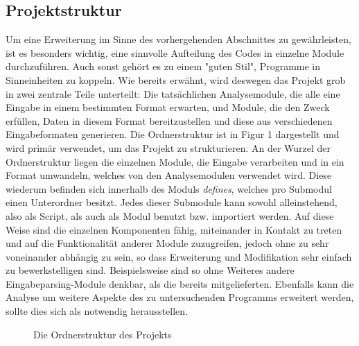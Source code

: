 \documentclass[11pt]{article}
\begin{document}
\subsection{Projektstruktur} Um eine Erweiterung im Sinne des vorhergehenden Abschnittes zu
gewährleisten, ist es besonders wichtig, eine sinnvolle Aufteilung des Codes in einzelne Module
durchzuführen. Auch sonst gehört es zu einem  "guten Stil", Programme in Sinneinheiten zu koppeln.
Wie bereits erwähnt, wird deswegen das Projekt grob in zwei zentrale Teile unterteilt: Die
tatsächlichen Analysemodule, die alle eine Eingabe in einem bestimmten Format erwarten, und Module,
die den Zweck erfüllen, Daten in diesem Format bereitzustellen und diese aus verschiedenen
Eingabeformaten generieren. Die Ordnerstruktur ist in Figur 1 dargestellt und wird
primär verwendet, um das Projekt zu strukturieren. An der Wurzel der Ordnerstruktur liegen die
einzelnen Module, die Eingabe verarbeiten und in ein Format umwandeln, welches von den Analysemodulen
verwendet wird. Diese wiederum befinden sich innerhalb des Moduls \textit{defines}, welches pro
Submodul einen Unterordner besitzt. Jedes dieser Submodule kann sowohl alleinstehend, also als
Script, als auch als Modul benutzt bzw. importiert werden. Auf diese Weise sind die
einzelnen Komponenten fähig, miteinander in Kontakt zu treten und auf die Funktionalität anderer
Module zuzugreifen, jedoch ohne zu sehr voneinander abhängig zu sein, so dass Erweiterung und
Modifikation sehr einfach zu bewerkstelligen sind. Beispielsweise sind so ohne Weiteres andere
Eingabeparsing-Module denkbar, als die bereits mitgelieferten. Ebenfalls kann die Analyse um weitere
Aspekte des zu untersuchenden Programms erweitert werden, sollte dies sich als notwendig
herausstellen.
\begin{figure}[h!]
	\caption{Die Ordnerstruktur des Projekts}
\end{figure}
\end{document}
